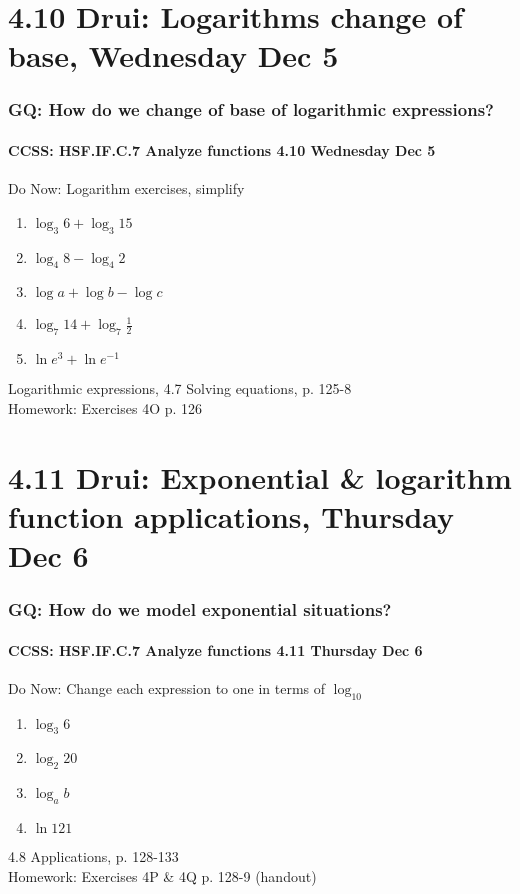 \documentclass{beamer}
\begin{document}
  \section{4.10 Drui: Logarithms change of base, Wednesday Dec 5}
    \frame
    {
      \frametitle{GQ: How do we change of base of logarithmic expressions?}
      \framesubtitle{CCSS: HSF.IF.C.7 Analyze functions    \alert{4.10 Wednesday Dec 5}}

      \begin{block}{Do Now: Logarithm exercises, simplify}
        \begin{enumerate}
            \item $\log_3 6 + \log_3 15$
            \item $\log_4 8 - \log_4 2$
            \item $\log a + \log b - \log c$
            \item $\displaystyle \log_7 14 + \log_7 \frac{1}{2}$
            \item $\ln e^3 +\ln e^{-1}$
        \end{enumerate}
      \end{block}
      Logarithmic expressions, 4.7 Solving equations, p. 125-8\\ \bigskip
      Homework: Exercises 4O p. 126
    }

  \section{4.11 Drui: Exponential \& logarithm function applications, Thursday Dec 6}
    \frame
    {
      \frametitle{GQ: How do we model exponential situations?}
      \framesubtitle{CCSS: HSF.IF.C.7 Analyze functions    \alert{4.11 Thursday Dec 6}}

      \begin{block}{Do Now: Change each expression to one in terms of $\log_{10}$}
        \begin{enumerate}
            \item $\log_3 6$
            \item $\log_2 20$
            \item $\log_a b$
            \item $\ln 121$
        \end{enumerate}
      \end{block}
      4.8 Applications, p. 128-133\\ \bigskip
      Homework: Exercises 4P \& 4Q p. 128-9 (handout)
    }
\end{document}
